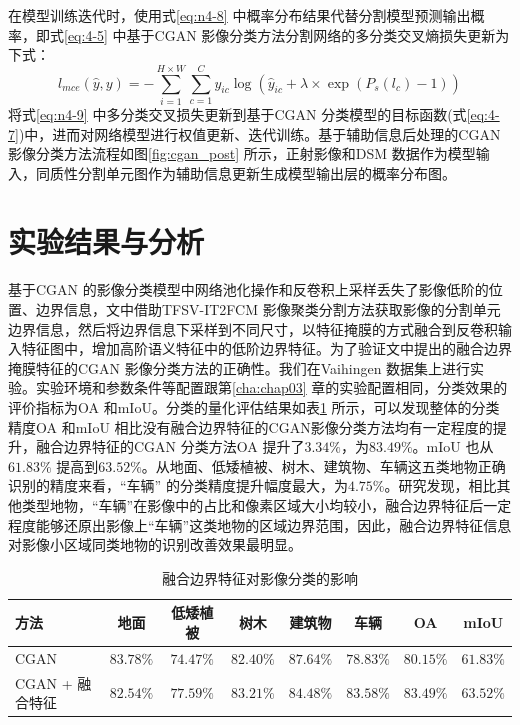 在模型训练迭代时，使用式\ref{eq:n4-8} 中概率分布结果代替分割模型预测输出概率，即式\ref{eq:4-5} 中基于CGAN 影像分类方法分割网络的多分类交叉熵损失更新为下式：
\begin{equation}
    \label{eq:n4-9}
    l_{mce} (\hat{y}, y) = -\sum_{i=1}^{H\times W}\sum_{c=1}^{C}y_{ic}\log(\hat{y}_{ic} + \lambda \times \exp(P_s(l_c)-1))
\end{equation}
将式\ref{eq:n4-9} 中多分类交叉损失更新到基于CGAN 分类模型的目标函数(式\ref{eq:4-7})中，进而对网络模型进行权值更新、迭代训练。基于辅助信息后处理的CGAN 影像分类方法流程如图\ref{fig:cgan_post} 所示，正射影像和DSM 数据作为模型输入，同质性分割单元图作为辅助信息更新生成模型输出层的概率分布图。


\section{实验结果与分析}
\label{sec::chap04-5}

基于CGAN 的影像分类模型中网络池化操作和反卷积上采样丢失了影像低阶的位置、边界信息，文中借助TFSV-IT2FCM 影像聚类分割方法获取影像的分割单元边界信息，然后将边界信息下采样到不同尺寸，以特征掩膜的方式融合到反卷积输入特征图中，增加高阶语义特征中的低阶边界特征。为了验证文中提出的融合边界掩膜特征的CGAN 影像分类方法的正确性。我们在Vaihingen 数据集上进行实验。实验环境和参数条件等配置跟第\ref{cha:chap03} 章的实验配置相同，分类效果的评价指标为OA 和mIoU。分类的量化评估结果如表\ref{tab:bianjie_cgan} 所示，可以发现整体的分类精度OA 和mIoU 相比没有融合边界特征的CGAN影像分类方法均有一定程度的提升，融合边界特征的CGAN 分类方法OA 提升了$3.34\%$，为$83.49\%$。mIoU 也从$61.83\%$ 提高到$63.52\%$。从地面、低矮植被、树木、建筑物、车辆这五类地物正确识别的精度来看，“车辆” 的分类精度提升幅度最大，为$4.75\%$。研究发现，相比其他类型地物，“车辆”在影像中的占比和像素区域大小均较小，融合边界特征后一定程度能够还原出影像上“车辆”这类地物的区域边界范围，因此，融合边界特征信息对影像小区域同类地物的识别改善效果最明显。

\begin{table}[!h]
    \centering
    \caption{融合边界特征对影像分类的影响}\label{tab:bianjie_cgan}
    \begin{tabular}{p{4cm}ccccccc}
        \toprule
        方法            & 地面      & 低矮植被  & 树木      & 建筑物    & 车辆      & OA        & mIoU      \\
        \midrule
        CGAN            & $83.78\%$ & $74.47\%$ & $82.40\%$ & $87.64\%$ & $78.83\%$ & $80.15\%$ & $61.83\%$ \\
        CGAN + 融合特征 & $82.54\%$ & $77.59\%$ & $83.21\%$ & $84.48\%$ & $83.58\%$ & $83.49\%$ & $63.52\%$ \\
        \bottomrule
    \end{tabular}
\end{table}

